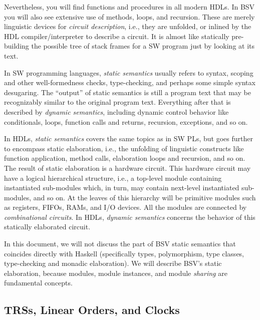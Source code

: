 \documentclass[11pt]{article}
\begin{document}
Nevertheless, you will find functions and procedures in all modern
HDLs.  In BSV you will also see extensive use of methods, loops, and
recursion.  These are merely linguistic devices for \emph{circuit
description}, i.e., they are unfolded, or inlined by the HDL
compiler/interpreter to describe a circuit.  It is almost like
statically pre-building the possible tree of stack frames for a SW
program just by looking at its text.

In SW programming languages, \emph{static semantics} usually refers to
syntax, scoping and other well-formedness checks, type-checking, and
perhaps some simple syntax desugaring.  The ``output'' of static
semantics is still a program text that may be recognizably similar to
the original program text.  Everything after that is described by
\emph{dynamic semantics}, including dynamic control behavior like
conditionals, loops, function calls and returns, recursion,
exceptions, and so on.

In HDLs, \emph{static semantics} covers the same topics as in SW PLs,
but goes further to encompass static elaboration, i.e., the unfolding
of linguistic constructs like function application, method calls,
elaboration loops and recursion, and so on.  The result of static
elaboration is a hardware circuit.  This hardware circuit may have a
logical hierarchical structure, i.e., a top-level module containing
instantiated sub-modules which, in turn, may contain next-level
instantiated sub-modules, and so on.  At the leaves of this hierarchy
will be primitive modules such as registers, FIFOs, RAMs, and I/O
devices.  All the modules are connected by \emph{combinational
circuits}.  In HDLs, \emph{dynamic semantics} concerns the behavior of
this statically elaborated circuit.

In this document, we will not discuss the part of BSV static semantics
that coincides directly with Haskell (specifically types,
polymorphism, type classes, type-checking and monadic elaboration).
We will describe BSV's static elaboration, because modules, module
instances, and module \emph{sharing} are fundamental concepts.


\subsection{TRSs, Linear Orders, and Clocks}
\end{document}
